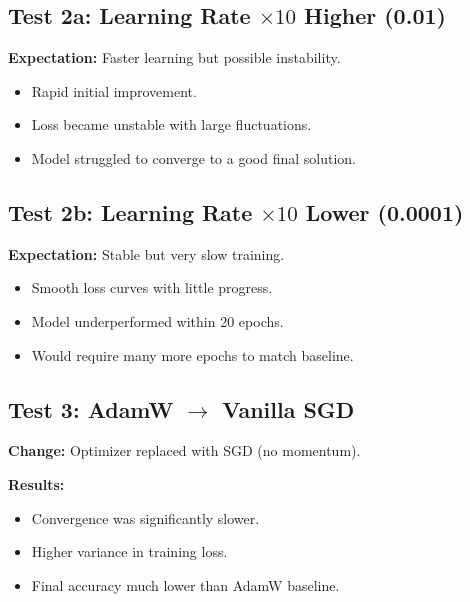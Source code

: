 \documentclass{article}
\begin{document}
\subsection{Test 2a: Learning Rate $\times 10$ Higher (0.01)}
\textbf{Expectation:} Faster learning but possible instability.
 
\begin{itemize}
    \item Rapid initial improvement.
    \item Loss became unstable with large fluctuations.
    \item Model struggled to converge to a good final solution.
\end{itemize}

\subsection{Test 2b: Learning Rate $\times 10$ Lower (0.0001)}
\textbf{Expectation:} Stable but very slow training.
 
\begin{itemize}
    \item Smooth loss curves with little progress.
    \item Model underperformed within 20 epochs.
    \item Would require many more epochs to match baseline.
\end{itemize}

\subsection{Test 3: AdamW $\rightarrow$ Vanilla SGD}
\textbf{Change:} Optimizer replaced with SGD (no momentum).

\textbf{Results:}
\begin{itemize}
    \item Convergence was significantly slower.
    \item Higher variance in training loss.
    \item Final accuracy much lower than AdamW baseline.
\end{itemize}
 
\end{document}

